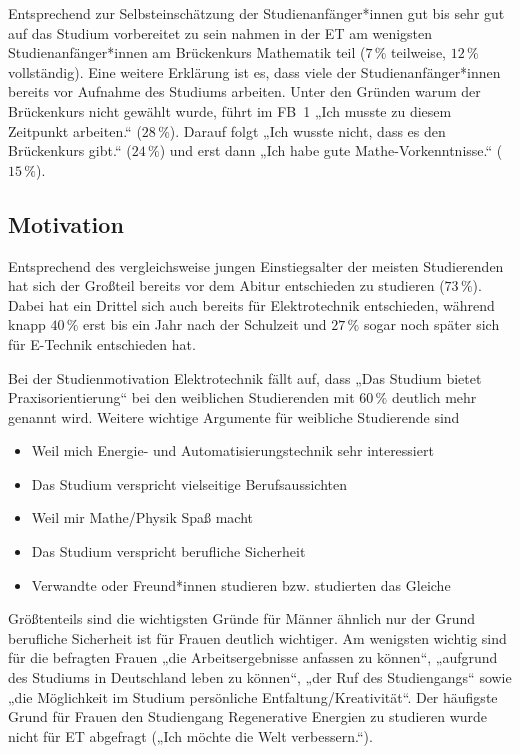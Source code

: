 \documentclass[a4paper, 12 pt]{IEEEtran}
\begin{document}
Entsprechend zur Selbsteinschätzung der Studienanfänger*innen gut bis sehr gut auf das Studium vorbereitet zu sein nahmen in der ET am wenigsten Studienanfänger*innen am Brückenkurs Mathematik teil ($7\,\%$ teilweise, $12\,\%$ vollständig). Eine weitere Erklärung ist es, dass viele der Studienanfänger*innen bereits vor Aufnahme des Studiums arbeiten. Unter den Gründen warum der Brückenkurs nicht gewählt wurde, führt im FB~1 „Ich musste zu diesem Zeitpunkt arbeiten.“ ($28\,\%$). Darauf folgt „Ich wusste nicht, dass es den Brückenkurs gibt.“ ($24\,\%$) und erst dann „Ich habe gute Mathe-Vorkenntnisse.“ ($15\,\%$). 

\subsection{Motivation}
Entsprechend des vergleichsweise jungen Einstiegsalter der meisten Studierenden hat sich der Großteil bereits vor dem Abitur entschieden zu studieren ($73\,\%$). Dabei hat ein Drittel sich auch bereits für Elektrotechnik entschieden, während knapp $40\,\%$ erst bis ein Jahr nach der Schulzeit und $27\,\%$ sogar noch später sich für E-Technik entschieden hat.

Bei der Studienmotivation Elektrotechnik fällt auf, dass „Das Studium bietet Praxisorientierung“ bei den weiblichen Studierenden mit $60\,\%$ deutlich mehr genannt wird. Weitere wichtige Argumente für weibliche Studierende sind
\begin{itemize}
\item Weil mich Energie- und Automatisierungstechnik sehr interessiert
\item Das Studium verspricht vielseitige Berufsaussichten
\item Weil mir Mathe/Physik Spaß macht
\item Das Studium verspricht berufliche Sicherheit
\item Verwandte oder Freund*innen studieren bzw. studierten das Gleiche
\end{itemize}

Größtenteils sind die wichtigsten Gründe für Männer ähnlich nur der Grund berufliche Sicherheit ist für Frauen deutlich wichtiger. Am wenigsten wichtig sind für die befragten Frauen „die Arbeitsergebnisse anfassen zu können“, „aufgrund des Studiums in Deutschland leben zu können“, „der Ruf des Studiengangs“ sowie „die Möglichkeit im Studium persönliche Entfaltung/Kreativität“. Der häufigste Grund für Frauen den Studiengang Regenerative Energien zu studieren wurde nicht für ET abgefragt („Ich möchte die Welt verbessern.“). 
\end{document}
